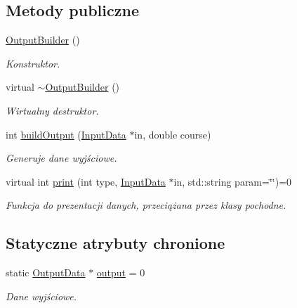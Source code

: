 \subsection*{\-Metody publiczne}
\begin{DoxyCompactItemize}
\item 
\hyperlink{class_output_builder_a321bc74d98dc8ae4e97f870bb0e93052}{\-Output\-Builder} ()
\begin{DoxyCompactList}\small\item\em \-Konstruktor. \end{DoxyCompactList}\item 
virtual \hyperlink{class_output_builder_a4d1b9970bf73f478c17e9b23693328ff}{$\sim$\-Output\-Builder} ()
\begin{DoxyCompactList}\small\item\em \-Wirtualny destruktor. \end{DoxyCompactList}\item 
int \hyperlink{class_output_builder_aa313904a69d986ea1c1e22b0a52b3d87}{build\-Output} (\hyperlink{class_input_data}{\-Input\-Data} $\ast$in, double course)
\begin{DoxyCompactList}\small\item\em \-Generuje dane wyjściowe. \end{DoxyCompactList}\item 
virtual int \hyperlink{class_output_builder_a5609a1e125b92c4d492724db53ffdf98}{print} (int type, \hyperlink{class_input_data}{\-Input\-Data} $\ast$in, std\-::string param=\char`\"{}\char`\"{})=0
\begin{DoxyCompactList}\small\item\em \-Funkcja do prezentacji danych, przeciążana przez klasy pochodne. \end{DoxyCompactList}\end{DoxyCompactItemize}
\subsection*{\-Statyczne atrybuty chronione}
\begin{DoxyCompactItemize}
\item 
static \hyperlink{class_output_data}{\-Output\-Data} $\ast$ \hyperlink{class_output_builder_acdc34b7fa1424904de710c69a7943209}{output} = 0
\begin{DoxyCompactList}\small\item\em \-Dane wyjściowe. \end{DoxyCompactList}\end{DoxyCompactItemize}



